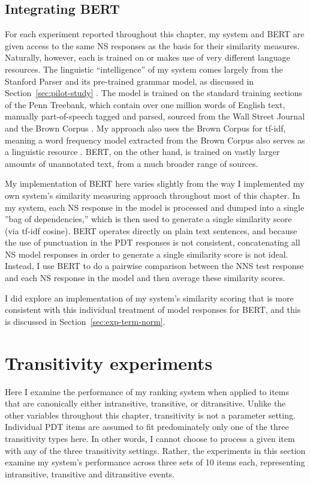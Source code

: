 \subsection{Integrating BERT}

For each experiment reported throughout this chapter, my system and BERT are given access to the same NS responses as the basis for their similarity measures. Naturally, however, each is trained on or makes use of very different language resources. The linguistic ``intelligence'' of my system comes largely from the Stanford Parser and its pre-trained grammar model, as discussed in Section~\ref{sec:pilot-study} \cite{klein:manning:03}. The model is trained on the standard training sections of the Penn Treebank, which contain over one million words of English text, manually part-of-speech tagged and parsed, sourced from the Wall Street Journal and the Brown Corpus \cite{marcus-et-al:93}. My approach also uses the Brown Corpus for tf-idf, meaning a word frequency model extracted from the Brown Corpus also serves as a linguistic resource \cite{kucera:francis:67}. BERT, on the other hand, is trained on vastly larger amounts of unannotated text, from a much broader range of sources.

My implementation of BERT here varies slightly from the way I implemented my own system's similarity measuring approach throughout most of this chapter. In my system, each NS response in the model is processed and dumped into a single ''bag of dependencies,'' which is then used to generate a single similarity score (via tf-idf cosine). BERT operates directly on plain text sentences, and because the use of punctuation in the PDT responses is not consistent, concatenating all NS model responses in order to generate a single similarity score is not ideal. Instead, I use BERT to do a pairwise comparison between the NNS test response and each NS response in the model and then average these similarity scores.

I did explore an implementation of my system's similarity scoring that is more consistent with this individual treatment of model responses for BERT, and this is discussed in Section~\ref{sec:exp-term-norm}.


\section{Transitivity experiments}
\label{sec:exp-transitivity}
Here I examine the performance of my ranking system when applied to items that are canonically either intransitive, transitive, or ditransitive. Unlike the other variables throughout this chapter, transitivity is not a parameter setting. Individual PDT items are assumed to fit predominately only one of the three transitivity types here. In other words, I cannot choose to process a given item with any of the three transitivity settings. Rather, the experiments in this section examine my system's performance across three sets of 10 items each, representing intransitive, transitive and ditransitive events.

